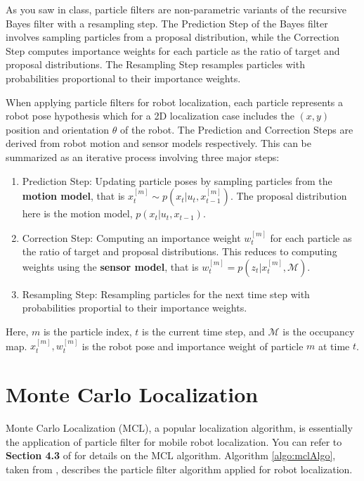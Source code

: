 \documentclass[12pt, a4paper]{article}
\begin{document}
As you saw in class, particle filters are non-parametric variants
of the recursive Bayes filter with a resampling step. The Prediction
Step of the Bayes filter involves sampling particles from a proposal
distribution, while the Correction Step computes importance weights
for each particle as the ratio of target and proposal distributions.
The Resampling Step resamples particles with probabilities proportional
to their importance weights.

When applying particle filters for robot localization, each particle
represents a robot pose hypothesis which for a 2D localization case
includes the $(x,y)$ position and orientation $\theta$ of the robot.
The Prediction and Correction Steps are derived from robot motion
and sensor models respectively. This can be summarized as an iterative
process involving three major steps:
\begin{enumerate}
\item Prediction Step: Updating particle poses by sampling particles from
the \textbf{motion model}, that is $x^{[m]}_t\sim p(x_t|u_t,x^{[m]}_{t-1})$.
The proposal distribution here is the motion model, $p(x_t|u_t,x_{t-1})$.
\item Correction Step: Computing an importance weight $w^{[m]}_t$ for each
particle as the ratio of target and proposal distributions. This reduces
to computing weights using the \textbf{sensor model}, that is $w^{[m]}_t = p(z_t|x^{[m]}_{t},\mathcal{M})$.
\item Resampling Step: Resampling particles for the next time step with
probabilities proportial to their importance weights.
\end{enumerate}
Here, $m$ is the particle index, $t$ is the current time step, and
$\mathcal{M}$ is the occupancy map. $x^{[m]}_t, w^{[m]}_t$ is the
robot pose and importance weight of particle $m$ at time $t$. 


\section{Monte Carlo Localization}

Monte Carlo Localization (MCL), a popular localization algorithm,
is essentially the application of particle filter for mobile robot
localization. You can refer to \textbf{Section 4.3 }of \cite{thrun2005probabilistic}
for details on the MCL algorithm. Algorithm \ref{algo:mclAlgo}, taken
from \cite{thrun2005probabilistic}, describes the particle filter
algorithm applied for robot localization. 
\end{document}
